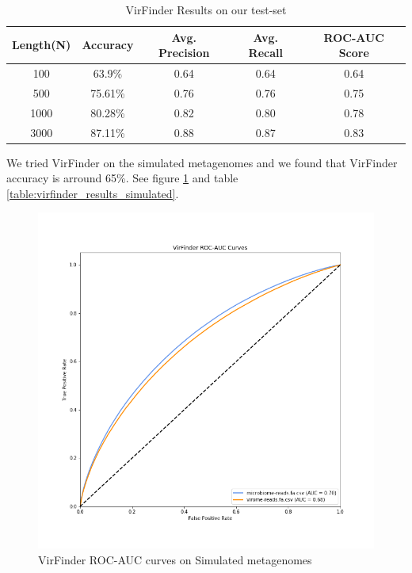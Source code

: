 \documentclass[conference]{IEEEtran}
\begin{document}
\begin{table}[h!]
	\centering
	\begin{tabular}{||c c c c c||} 
		Length(N) &	Accuracy & Avg. Precision & Avg. Recall &	ROC-AUC Score \\ [0.5ex] 
		\hline\hline
		100 &	63.9\%	& 0.64 & 0.64 & 0.64 \\
		500 &	75.61\% &	0.76 & 0.76 & 0.75 \\
		1000 &	80.28\% & 0.82 & 0.80 & 0.78 \\
		3000 &	87.11\% & 0.88 & 0.87 & 0.83\\[1ex]
	\end{tabular}
	\caption{VirFinder Results on our test-set}
	\label{table:virfinder_results}
\end{table}


We tried VirFinder on the simulated metagenomes and we found that VirFinder accuracy is arround 65\%. See figure \ref{fig:roc_auc_virfinder_simulated} and table \ref{table:virfinder_results_simulated}.

\begin{figure}
	\centering
	\includegraphics[width=\columnwidth]{imgs/roc_auc_simulated.png}
	\caption{VirFinder ROC-AUC curves on Simulated metagenomes}
	\label{fig:roc_auc_virfinder_simulated}
\end{figure}
\end{document}

